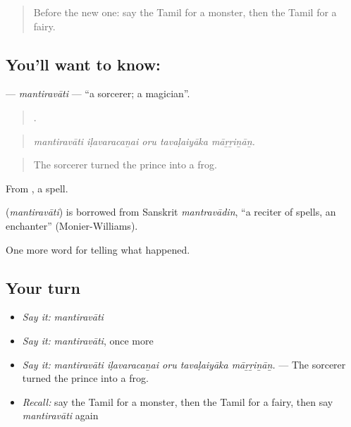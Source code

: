 \label{lesson:TA-C344-mantiravati}



\begin{quote}
Before the new one: say the Tamil for a monster, then the Tamil for a fairy.
\end{quote}

\subsection*{You'll want to know: }
\textbf{} — \emph{mantiravāti} — \textquotedblleft{}a sorcerer; a magician\textquotedblright{}.

\begin{quote}
    .
\end{quote}

\begin{quote}
\emph{mantiravāti iḷavaracaṉai oru tavaḷaiyāka māṟṟiṉāṉ.}
\end{quote}

\begin{quote}
The sorcerer turned the prince into a frog.
\end{quote}

From , a spell.

\begin{cousinweb}
\textbf{} (\emph{mantiravāti}) is borrowed from Sanskrit \emph{mantravādin}, \textquotedblleft{}a reciter of spells, an enchanter\textquotedblright{} (Monier-Williams).
\end{cousinweb}

\begin{grammarlens}[title={What you've built}]
One more word for telling what happened.
\end{grammarlens}

\subsection*{Your turn}
\begin{itemize}
\raggedright
  \item \emph{Say it:} \emph{mantiravāti}
  \item \emph{Say it:} \emph{mantiravāti}, once more
  \item \emph{Say it:} \emph{mantiravāti iḷavaracaṉai oru tavaḷaiyāka māṟṟiṉāṉ.} — The sorcerer turned the prince into a frog.
  \item \emph{Recall:} say the Tamil for a monster, then the Tamil for a fairy, then say \emph{mantiravāti} again
\end{itemize}

